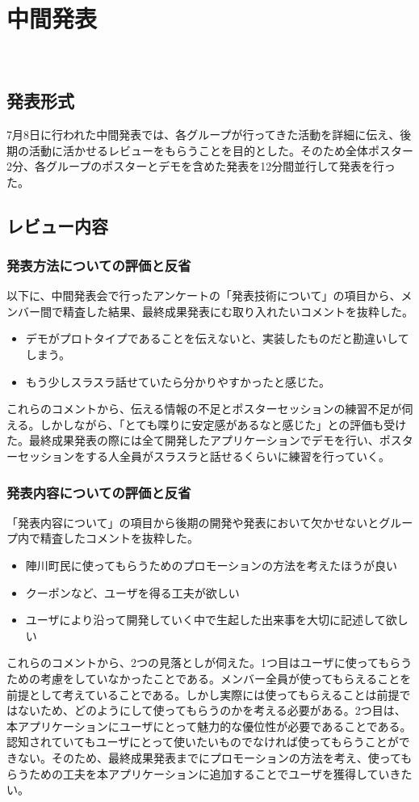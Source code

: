 \chapter{中間発表}
​
\section{発表形式}
7月8日に行われた中間発表では、各グループが行ってきた活動を詳細に伝え、後期の活動に活かせるレビューをもらうことを目的とした。そのため全体ポスター2分、各グループのポスターとデモを含めた発表を12分間並行して発表を行った。
\section{レビュー内容}%
\subsection{発表方法についての評価と反省}%
以下に、中間発表会で行ったアンケートの「発表技術について」の項目から、メンバー間で精査した結果、最終成果発表にむ取り入れたいコメントを抜粋した。
\begin{itemize}
  \item デモがプロトタイプであることを伝えないと、実装したものだと勘違いしてしまう。
  \item もう少しスラスラ話せていたら分かりやすかったと感じた。
\end{itemize}
    これらのコメントから、伝える情報の不足とポスターセッションの練習不足が伺える。しかしながら、「とても喋りに安定感があるなと感じた」との評価も受けた。最終成果発表の際には全て開発したアプリケーションでデモを行い、ポスターセッションをする人全員がスラスラと話せるくらいに練習を行っていく。

\subsection{発表内容についての評価と反省}
    「発表内容について」の項目から後期の開発や発表において欠かせないとグループ内で精査したコメントを抜粋した。
\begin{itemize}
  \item 陣川町民に使ってもらうためのプロモーションの方法を考えたほうが良い
  \item クーポンなど、ユーザを得る工夫が欲しい
  \item ユーザにより沿って開発していく中で生起した出来事を大切に記述して欲しい
\end{itemize}
    これらのコメントから、2つの見落としが伺えた。1つ目はユーザに使ってもらうための考慮をしていなかったことである。メンバー全員が使ってもらえることを前提として考えていることである。しかし実際には使ってもらえることは前提ではないため、どのようにして使ってもらうのかを考える必要がある。2つ目は、本アプリケーションにユーザにとって魅力的な優位性が必要であることである。認知されていてもユーザにとって使いたいものでなければ使ってもらうことができない。そのため、最終成果発表までにプロモーションの方法を考え、使ってもらうための工夫を本アプリケーションに追加することでユーザを獲得していきたい。
